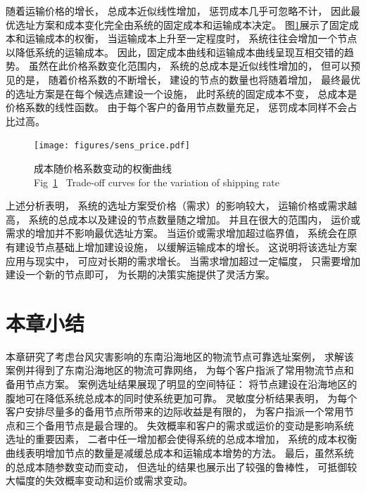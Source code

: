 随着运输价格的增长，
总成本近似线性增加，
惩罚成本几乎可忽略不计，
因此最优选址方案和成本变化完全由系统的固定成本和运输成本决定。
图\ref{fig:sens_price}展示了固定成本和运输成本的权衡，
当运输成本上升至一定程度时，
系统往往会增加一个节点以降低系统的运输成本。
因此，固定成本曲线和运输成本曲线呈现互相交错的趋势。
虽然在此价格系数变化范围内，
系统的总成本是近似线性增加的，
但可以预见的是，
随着价格系数的不断增长，
建设的节点的数量也将随着增加，
最终最优的选址方案是在每个候选点建设一个设施，
此时系统的固定成本不变，
总成本是价格系数的线性函数。
由于每个客户的备用节点数量充足，
惩罚成本同样不会占比过高。

\begin{figure}[!h] %
	\setlength{\belowcaptionskip}{-0.5cm} 
	  \centering
	  \texttt{[image: figures/sens\_price.pdf]}
	  \caption{成本随价格系数变动的权衡曲线\\
	  Fig~\ref{fig:sens_price}~ Trade-off curves for the variation of shipping rate}
	  \label{fig:sens_price}
\end{figure}

上述分析表明，
系统的选址方案受价格（需求）的影响较大，
运输价格或需求越高，
系统的总成本以及建设的节点数量随之增加。
并且在很大的范围内，
运价或需求的增加并不影响最优选址方案。
当运价或需求增加超过临界值，
系统会在原有建设节点基础上增加建设设施，
以缓解运输成本的增长。
这说明将该选址方案应用与现实中，
可应对长期的需求增长。
当需求增加超过一定幅度，
只需要增加建设一个新的节点即可，
为长期的决策实施提供了灵活方案。



\section{本章小结}
\label{sec:小结6}

本章研究了考虑台风灾害影响的东南沿海地区的物流节点可靠选址案例，
求解该案例并得到了东南沿海地区的物流可靠网络，
为每个客户指派了常用物流节点和备用节点方案。
案例选址结果展现了明显的空间特征：
将节点建设在沿海地区的腹地可在降低系统总成本的同时使系统更加可靠。
灵敏度分析结果表明，
为每个客户安排尽量多的备用节点所带来的边际收益是有限的，
为客户指派一个常用节点和三个备用节点是最合理的。
失效概率和客户的需求或运价的变动是影响系统选址的重要因素，
二者中任一增加都会使得系统的总成本增加，
系统的成本权衡曲线表明增加节点的数量是减缓总成本和运输成本增势的方法。
最后，虽然系统的总成本随参数变动而变动，
但选址的结果也展示出了较强的鲁棒性，
可抵御较大幅度的失效概率变动和运价或需求变动。


